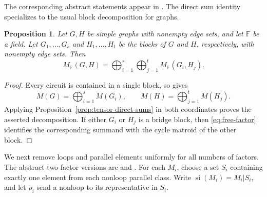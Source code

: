 \documentclass[12pt,a4paper]{article}
\numberwithin{equation}{section}
\newcommand{\F}{\mathbb F}
\newtheorem{proposition}[proposition]{Proposition}
\theoremstyle{definition}
\theoremstyle{remark}
\begin{document}
The corresponding abstract statements appear in
\cite[Proposition~2.5 and Lemma~2.3]{anderson-matroid-products}.
The direct sum identity specializes to the usual block decomposition
for graphs.
\begin{proposition}\label{prop:block-decomposition}
Let \(G,H\) be simple graphs with nonempty edge sets, and let \(\F\)
be a field.  Let \(G_1,\ldots,G_s\) and \(H_1,\ldots,H_t\) be the
blocks of \(G\) and \(H\), respectively, with nonempty edge sets.  Then
\[
 M_{\F}(G,H)=\bigoplus_{i=1}^{s}\bigoplus_{j=1}^{t}
 M_{\F}(G_i,H_j).
\]
\end{proposition}
\begin{proof}
Every circuit is contained in a single block, so
\cite[Section~4.1 and Corollary~4.2.9]{oxley} gives
\[
 M(G)=\bigoplus_{i=1}^{s}M(G_i),\qquad
 M(H)=\bigoplus_{j=1}^{t}M(H_j).
\]
Applying Proposition~\ref{prop:tensor-direct-sums} in both coordinates
proves the asserted decomposition.  If either \(G_i\) or \(H_j\) is a bridge block,
then \eqref{eq:free-factor} identifies the corresponding summand with
the cycle matroid of the other block.
\end{proof}

We next remove loops and parallel elements uniformly for all numbers
of factors.  The abstract two-factor versions are
\cite[Lemma~2.4]{anderson-matroid-products} and
\cite[Lemma~4.4 of the expanded version]{berczi-skew-tensor}.
For each \(M_i\), choose a set \(S_i\) containing exactly one element
from each nonloop parallel class.  Write
\(\operatorname{si}(M_i)=M_i|S_i\), and let \(\rho_i\) send a
nonloop to its representative in \(S_i\).
\end{document}
